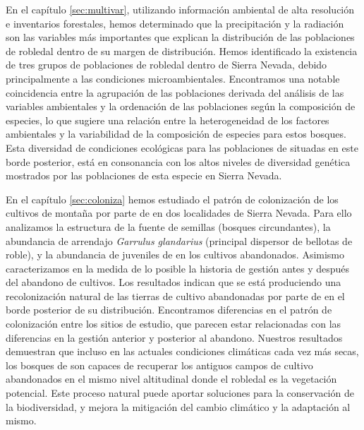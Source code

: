 En el capítulo \ref{sec:multivar}, utilizando información ambiental de alta resolución e inventarios forestales, hemos determinado que la precipitación y la radiación son las variables más importantes que explican la distribución de las poblaciones de robledal dentro de su margen de distribución. Hemos identificado la existencia de tres grupos de poblaciones de robledal dentro de Sierra Nevada, debido principalmente a las condiciones microambientales. Encontramos una notable coincidencia entre la agrupación de las poblaciones derivada del análisis de las variables ambientales y la ordenación de las poblaciones según la composición de especies, lo que sugiere una relación entre la heterogeneidad de los factores ambientales y la variabilidad de la composición de especies para estos bosques. Esta diversidad de condiciones ecológicas para las poblaciones de \Qp situadas en este borde posterior, está en consonancia con los altos niveles de diversidad genética mostrados por las poblaciones de esta especie en Sierra Nevada. 

En el capítulo \ref{sec:coloniza} hemos estudiado el patrón de colonización de los cultivos de montaña por parte de \Qp en dos localidades de Sierra Nevada. Para ello analizamos la estructura de la fuente de semillas (bosques circundantes), la abundancia de arrendajo \emph{Garrulus glandarius} (principal dispersor de bellotas de roble), y la abundancia de juveniles de \Qp en los cultivos abandonados. Asimismo caracterizamos en la medida de lo posible la historia de gestión antes y después del abandono de cultivos. Los resultados indican que se está produciendo una recolonización natural de las tierras de cultivo abandonadas por parte de \Qp en el borde posterior de su distribución. Encontramos diferencias en el patrón de colonización entre los sitios de estudio, que parecen estar relacionadas con las diferencias en la gestión anterior y posterior al abandono. Nuestros resultados demuestran que incluso en las actuales condiciones climáticas cada vez más secas, los bosques de \Qp son capaces de recuperar los antiguos campos de cultivo abandonados en el mismo nivel altitudinal donde el robledal es la vegetación potencial. Este proceso natural puede aportar soluciones para la conservación de la biodiversidad, y mejora la mitigación del cambio climático y la adaptación al mismo. 

